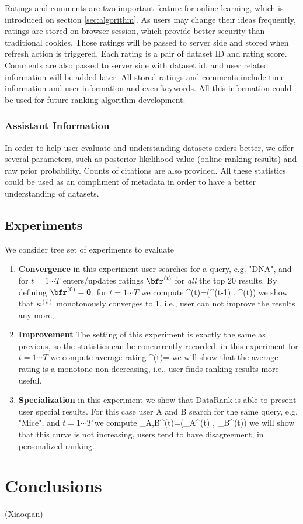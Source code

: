 \documentclass[twoside,11pt]{article}
\begin{document}
        Ratings and comments are two important feature for online learning, which is introduced on section \ref{sec:algorithm}. As users may change their ideas frequently, ratings are stored on browser session, which provide better security than traditional cookies. Those ratings will be passed to server side and stored when refresh action is triggered. Each rating is a pair of dataset ID and rating score. Comments are also passed to server side with dataset id, and user related information will be added later. All stored ratings and comments include time information and user information and even keywords. All this information could be used for future ranking algorithm development.


    \subsubsection{Assistant Information} %
    \label{ssub:assistant_information}
    
        In order to help user evaluate and understanding datasets orders better, we offer several parameters, such as posterior likelihood value (online ranking results) and raw prior probability. Counts of citations are also provided. All these statistics could be used as an compliment of metadata in order to have a better understanding of datasets.
\subsection{Experiments}
We consider tree set of experiments to evaluate
\begin{enumerate}
\item {\bf Convergence} in this experiment user searches for a query, e.g. "DNA", and for $t=1\cdots T$ enters/updates ratings  $\bfr^{(t)}$ for \emph{all} the top 20 results. By defining $\bfr^{(0)}= {\mathbf 0}$, for $t=1\cdots T$ we compute
\beq
\kappa^{(t)}=\kappa(\bfr^{(t-1)} , \bfr^{(t)})
\eeq
we show that $\kappa^{(t)}$ monotonously converges to 1, i.e., user can not improve the results any more,.
\item {\bf Improvement} The setting of this experiment is exactly the same as previous, so the statistics can be concurrently recorded. in this experiment for $t=1\cdots T$ we compute average rating 
\beq
\bbfr^{(t)}=
\eeq
we will show that the average rating is a monotone non-decreasing, i.e., user finds ranking results more useful.
\item {\bf Specialization} in this experiment we show that DataRank is able to present user special results. For this case user A and B search for the same query, e.g. "Mice", and $t=1\cdots T$ we compute
\beq
\kappa_{A,B}^{(t)}=\kappa(\bfr_A^{(t)} , \bfr_B^{(t)})
\eeq
we will show that this curve is not increasing, users tend to have disagreement, in personalized ranking.
\end{enumerate}
\section{Conclusions} \label{sec:conclusions}
(Xiaoqian)


\end{document}
